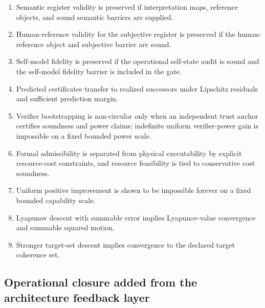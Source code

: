 \documentclass[11pt]{article}
\newcommand{\1}{\mathbf{1}}
\begin{document}
\begin{enumerate}[label=(\arabic*)]
    \item Semantic register validity is preserved if interpretation maps, reference objects, and sound semantic barriers are supplied.
    \item Human-reference validity for the subjective register is preserved if the human-reference object and subjective barrier are sound.
    \item Self-model fidelity is preserved if the operational self-state audit is sound and the self-model fidelity barrier is included in the gate.
    \item Predicted certificates transfer to realized successors under Lipschitz residuals and sufficient prediction margin.
    \item Verifier bootstrapping is non-circular only when an independent trust anchor certifies soundness and power claims; indefinite uniform verifier-power gain is impossible on a fixed bounded power scale.
    \item Formal admissibility is separated from physical executability by explicit resource-cost constraints, and resource feasibility is tied to conservative cost soundness.
    \item Uniform positive improvement is shown to be impossible forever on a fixed bounded capability scale.
    \item Lyapunov descent with summable error implies Lyapunov-value convergence and summable squared motion.
    \item Stronger target-set descent implies convergence to the declared target coherence set.
\end{enumerate}

\subsection*{Operational closure added from the architecture feedback layer}
\end{document}
